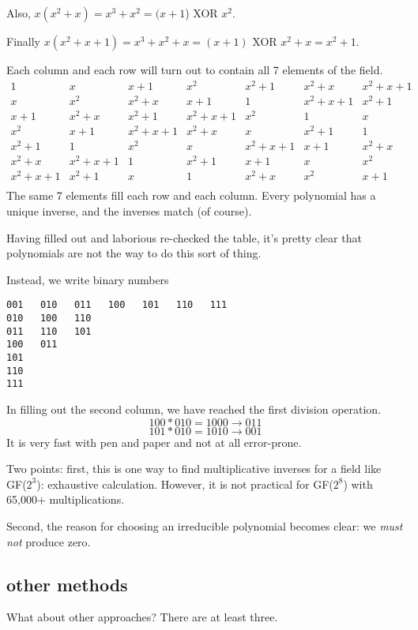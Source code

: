 \documentclass[11pt, oneside]{article}
\begin{document}
Also, $x(x^2 + x) = x^3 + x^2 = (x + 1$) XOR $x^2$.  

Finally $x(x^2 + x + 1) = x^3 + x^2 + x = (x + 1) $ XOR $x^2 + x = x^2 + 1$.

Each column and each row will turn out to contain all 7 elements of the field.  
\large
\[ 
\begin{matrix}
1 & x & x + 1 & x^2 & x^2 + 1 & x^2 + x & x^2 + x + 1 \\
x & x^2 & x^2 + x & x + 1 & 1 & x^2 + x + 1  & x^2 + 1 \\
x + 1 & x^2 + x & x^2 + 1 & x^2 + x + 1 & x^2 & 1 & x \\
x^2 & x + 1  & x^2 + x + 1 & x^2 + x & x & x^2 + 1 & 1 \\
x^2 + 1 & 1  & x^2 & x & x^2 + x + 1 & x + 1 & x^2 + x \\
x^2 + x & x^2 + x + 1   & 1 & x^2 + 1& x + 1 & x & x^2 \\
x^2 + x + 1 & x^2 + 1 & x & 1 & x^2 + x & x^2 & x + 1 \\
\end{matrix} 
\]
\Large
The same 7 elements fill each row and each column.  Every polynomial has a unique inverse, and the inverses match (of course).

Having filled out and laborious re-checked the table, it's pretty clear that polynomials are not the way to do this sort of thing.

Instead, we write binary numbers

\begin{verbatim}
001   010   011   100   101   110   111
010   100   110
011   110   101
100   011
101
110
111
\end{verbatim} 

In filling out the second column, we have reached the first division operation.
\[ 100 * 010 = 1000 \rightarrow 011 \]
\[ 101 * 010 = 1010 \rightarrow 001 \]
It is very fast with pen and paper and not at all error-prone.

Two points:  first, this is one way to find multiplicative inverses for a field like GF($2^3$):  exhaustive calculation.  However, it is not practical for GF($2^8$) with 65,000+ multiplications.

Second, the reason for choosing an irreducible polynomial becomes clear:  we \emph{must not} produce zero.

\subsection*{other methods}
What about other approaches?  There are at least three.
\end{document}
